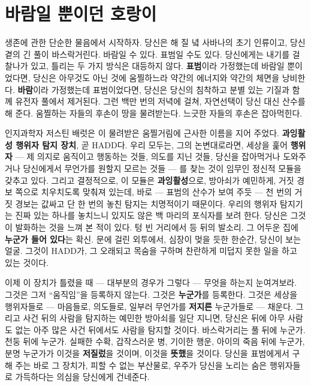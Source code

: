 \section*{바람일 뿐이던 호랑이}

생존에 관한 단순한 물음에서 시작하자. 당신은 해 질 녘 사바나의 초기 인류이고, 당신 곁의 긴 풀이 바스락거린다. 바람일 수 있다. 표범일 수도 있다. 당신에게는 내기를 걸 찰나가 있고, 틀리는 두 가지 방식은 대등하지 않다. \textbf{표범}이라 가정했는데 바람일 뿐이었다면, 당신은 아무것도 아닌 것에 움찔하느라 약간의 에너지와 약간의 체면을 낭비한다. \textbf{바람}이라 가정했는데 표범이었다면, 당신은 당신의 침착하고 분별 있는 기질과 함께 유전자 풀에서 제거된다. 그런 백만 번의 저녁에 걸쳐, 자연선택이 당신 대신 산수를 해 준다. 움찔하는 자들의 후손이 땅을 물려받는다. 느긋한 자들의 후손은 잡아먹힌다.

인지과학자 저스틴 배럿은 이 물려받은 움찔거림에 근사한 이름을 지어 주었다. \textbf{과잉활성 행위자 탐지 장치}, 곧 HADD다. 우리 모두는, 그의 논변대로라면, 세상을 훑어 \textbf{행위자} — 제 의지로 움직이고 행동하는 것들, 의도를 지닌 것들, 당신을 잡아먹거나 도와주거나 당신에게서 무언가를 원할지 모르는 것들 — 를 찾는 것이 임무인 정신적 모듈을 갖추고 있다. 그리고 결정적으로, 이 모듈은 \textbf{과잉활성}으로, 방아쇠가 예민하게, 거짓 경보 쪽으로 치우치도록 맞춰져 있는데, 바로 — 표범의 산수가 보여 주듯 — 천 번의 거짓 경보는 값싸고 단 한 번의 놓친 탐지는 치명적이기 때문이다. 우리의 행위자 탐지기는 진짜 있는 하나를 놓치느니 있지도 않은 백 마리의 포식자를 보려 한다. 당신은 그것이 발화하는 것을 느껴 본 적이 있다. 텅 빈 거리에서 등 뒤의 발소리. 그 어두운 집에 \textbf{누군가 들어 있다}는 확신. 문에 걸린 외투에서, 심장이 멎을 듯한 한순간, 당신이 보는 얼굴. 그것이 HADD가, 그 오래되고 목숨을 구하며 찬란하게 미덥지 못한 일을 하고 있는 것이다.

이제 이 장치가 틀렸을 때 — 대부분의 경우가 그렇다 — 무엇을 하는지 눈여겨보라. 그것은 그저 ``움직임''을 등록하지 않는다. 그것은 \textbf{누군가}를 등록한다. 그것은 세상을 행위자들로 — 마음들로, 의도들로, 일부러 무언가를 \textbf{저지른} 누군가들로 — 채운다. 그리고 사건 뒤의 사람을 탐지하는 예민한 방아쇠를 일단 지니면, 당신은 뒤에 아무 사람도 없는 아주 많은 사건 뒤에서도 사람을 탐지할 것이다. 바스락거리는 풀 뒤에 누군가. 천둥 뒤에 누군가. 실패한 수확, 갑작스러운 병, 기이한 행운, 아이의 죽음 뒤에 누군가, 분명 누군가가 이것을 \textbf{저질렀}을 것이며, 이것을 \textbf{뜻했}을 것이다. 당신을 표범에게서 구해 주는 바로 그 장치가, 피할 수 없는 부산물로, 우주가 당신을 노리는 숨은 행위자들로 가득하다는 의심을 당신에게 건네준다.


